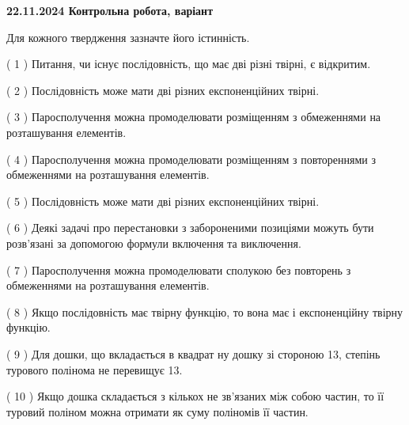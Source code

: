 \documentclass[12pt, ukrainian]{article}
\begin{document}
\vspace{4mm}
\newpage
\begin {large}

\textbf{22.11.2024 Контрольна робота, варіант  }\par


{
Для кожного твердження зазначте його істинність.\par
\vspace{2mm}
( 1 ) Питання, чи існує послідовність, що має дві різні твірні, є відкритим.%

( 2 ) Послідовність може мати дві різних експоненційних твірні.%

( 3 ) Паросполучення можна промоделювати розміщенням з обмеженнями на розташування елементів.%

( 4 ) Паросполучення можна промоделювати розміщенням з повтореннями з обмеженнями на розташування елементів.%

( 5 ) Послідовність може мати дві різних експоненційних твірні.%

( 6 ) Деякі задачі про перестановки з забороненими позиціями можуть бути розв’я\-за\-ні за допомогою формули включення та виключення.%

( 7 ) Паросполучення можна промоделювати сполукою без повторень з обмеженнями на розташування елементів.%

( 8 ) Якщо послідовність має твірну функцію, то вона має і експоненційну твірну функцію.%

( 9 ) Для дошки, що вкладається в квадрат ну дошку зі стороною 13, степінь турового полінома не перевищує 13.%

( 10 ) Якщо дошка складається з кількох не зв’язаних між собою частин, то її туровий поліном можна отримати як суму поліномів її частин.%


\vspace{5mm}
}
\end {large}
\end{document}
